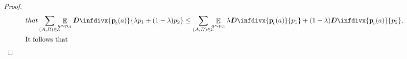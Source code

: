 \documentclass{article}
\theoremstyle{plain}
\theoremstyle{definition}
\theoremstyle{remark}
\newcommand{\thickD}{I\mkern-8muD}
\newcommand{\kldiv}{\thickD\infdivx}
\DeclareMathOperator*{\E}{\mathbb{E}} %
\newcommand\mat[1]{\mathbf{#1}}
\newcommand{\bp}[1][L]{\mat{p}_{\!_{#1}\!}}
\newcommand{\Ed}{\mathcal E}
\numberwithin{equation}{section}
\begin{document}
\begin{proof}
\begin{align*}
{                        that}
					\sum_{(A, B) \in \Ed}\mskip-10mu\E_{a\sim p_A} \kldiv{\bp(a) }{\lambda p_1 + (1-\lambda) p_2} 
			&\leq \sum_{(A, B) \in
							  \Ed}\mskip-10mu\E_{a\sim p_A}\lambda
							\kldiv{\bp(a)}{p_1} + (1-\lambda)
							\kldiv{\bp(a)}{p_2}. \\
%
    \shortintertext{It follows that} 

\end{align*}
\end{proof}
\end{document}
